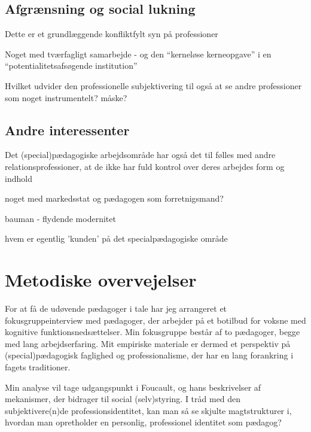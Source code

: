 \subsection{Afgrænsning og social lukning}
Dette er et grundlæggende konfliktfylt syn på professioner 

Noget med tværfagligt samarbejde - og den “kerneløse kerneopgave” i en “potentialitetsafsøgende institution” \autocite{mik-meyerIndledningSkabeProfessionel2012}

Hvilket udvider den professionelle subjektivering til også at se andre professioner som noget instrumentelt? måske?

\subsection{Andre interessenter}
Det (special)pædagogiske arbejdsområde har også det til følles med andre  relationsprofessioner, at de ikke har fuld kontrol over deres arbejdes form og indhold

noget med markedsstat og pædagogen som forretnigsmand?


bauman - flydende modernitet

hvem er egentlig 'kunden' på det specialpædagogiske område

\section{Metodiske overvejelser}

For at få de udøvende pædagoger i tale har jeg arrangeret et fokusgruppeinterview med pædagoger, der arbejder på et botilbud for voksne med kognitive funktionsnedsættelser.
Min fokusgruppe består af to pædagoger, begge med lang arbejdserfaring.
Mit empiriske materiale er dermed et perspektiv på (special)pædagogisk faglighed og professionalisme, der har en lang forankring i fagets traditioner.

Min analyse vil tage udgangspunkt i Foucault, og hans beskrivelser af mekanismer, der bidrager til social (selv)styring. I tråd med den subjektivere(n)de professionsidentitet, kan man så se skjulte magtstrukturer i, hvordan man opretholder en personlig, professionel identitet som pædagog?

